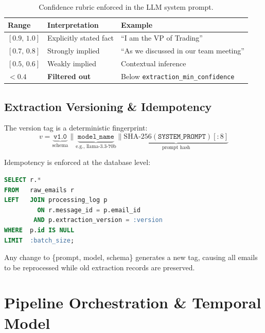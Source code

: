\documentclass[11pt,a4paper]{article}
\newcommand{\code}[1]{\texttt{\small#1}}
\begin{document}
\begin{table}[H]
\centering\small
\begin{tabularx}{\linewidth}{C{2.0cm} L{4.0cm} X}
\toprule
{}
\color{white}\textbf{Range} & \color{white}\textbf{Interpretation} & \color{white}\textbf{Example} \\
\midrule
$[0.9,\,1.0]$ & Explicitly stated fact & ``I am the VP of Trading'' \\
$[0.7,\,0.8]$ & Strongly implied        & ``As we discussed in our team meeting'' \\
$[0.5,\,0.6]$ & Weakly implied          & Contextual inference \\
$<0.4$        & \textbf{Filtered out}   & Below \code{extraction\_min\_confidence} \\
\bottomrule
\end{tabularx}
\caption{Confidence rubric enforced in the LLM system prompt.}
\end{table}

\subsection{Extraction Versioning \& Idempotency}

The version tag is a deterministic fingerprint:
\begin{equation}
  v = \underbrace{\texttt{v1.0}}_{\text{schema}}
    \mathbin{\|} \underbrace{\texttt{model\_name}}_{\text{e.g., llama-3.3-70b}}
    \mathbin{\|} \underbrace{\mathrm{SHA\text{-}256}(\texttt{SYSTEM\_PROMPT})[:8]}_{\text{prompt hash}}
\end{equation}

Idempotency is enforced at the database level:
\begin{lstlisting}[language=SQL, caption={Idempotent unprocessed email query}]
SELECT r.*
FROM   raw_emails r
LEFT   JOIN processing_log p
         ON r.message_id = p.email_id
        AND p.extraction_version = :version
WHERE  p.id IS NULL
LIMIT  :batch_size;
\end{lstlisting}

Any change to \{prompt, model, schema\} generates a new tag, causing all emails
to be reprocessed while old extraction records are preserved.

\section{Pipeline Orchestration \& Temporal Model}
\end{document}
